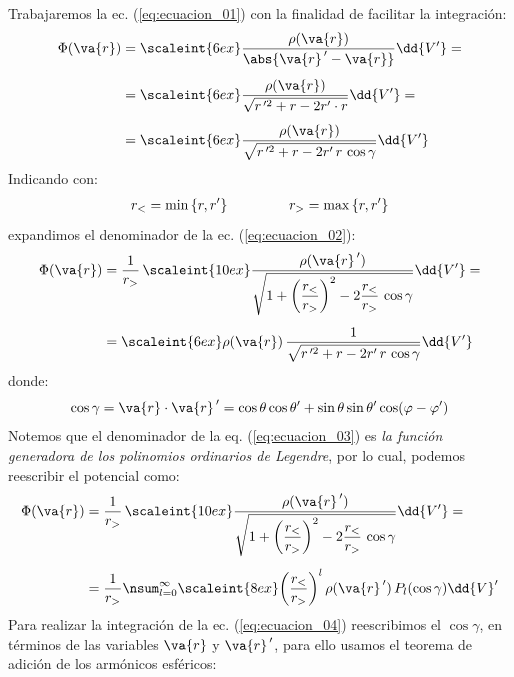 Trabajaremos la ec. (\ref{eq:ecuacion_01}) con la finalidad de facilitar la integración:
\begin{align}
\begin{aligned}
\Phi (\va{r}) &= \scaleint{6ex} \dfrac{\rho(\va{r})}{\abs{\va{r}^{\, \prime} - \va{r}}} \dd{V^{\prime}} = \\[0.5em]
&= \scaleint{6ex} \dfrac{\rho(\va{r})}{\sqrt{r^{\, \prime 2} + r - 2 r^{\prime} \cdot r}} \dd{V^{\prime}} = \\[0.5em]
&= \scaleint{6ex} \dfrac{\rho(\va{r})}{\sqrt{r^{\, \prime 2} + r - 2 r^{\prime} \, r \, \cos \gamma }} \dd{V^{\prime}}
\end{aligned}
\label{eq:ecuacion_02}
\end{align}
Indicando con:
\begin{align*}
r_{<} = \min \left\{ r, r^{\prime} \right\} \hspace{1.5cm} r_{>} = \max \left\{ r, r^{\prime} \right\}
\end{align*}
expandimos el denominador de la ec. (\ref{eq:ecuacion_02}):
\begin{align}
\Phi (\va{r}) &= \dfrac{1}{r_{>}} \, \scaleint{10ex} \dfrac{\rho (\va{r}^{\, \prime})}{\sqrt{1 + \bigg( \dfrac{r_{<}}{r_{>}} \bigg)^{2} - 2 \dfrac{r_{<}}{r_{>}} \, \cos \gamma}} \dd{V^{\prime}} = \\[0.5em]
&= \scaleint{6ex} \rho(\va{r}) \, \dfrac{1}{\sqrt{r^{\, \prime 2} + r - 2 r^{\prime} \, r \, \cos \gamma }} \dd{V^{\prime}}
\label{eq:ecuacion_03}
\end{align}
donde:
\begin{align*}
\cos \gamma = \va{r} \cdot \va{r}^{\, \prime} = \cos \theta \cos \theta^{\prime} +  \sin \theta \sin \theta^{\prime} \cos (\varphi - \varphi^{\prime})
\end{align*}
Notemos que el denominador de la eq. (\ref{eq:ecuacion_03}) es \emph{la función generadora de los polinomios ordinarios de Legendre}, por lo cual, podemos reescribir el potencial como:
\begin{align}
\Phi (\va{r}) &= \dfrac{1}{r_{>}} \, \scaleint{10ex} \dfrac{\rho (\va{r}^{\, \prime})}{\sqrt{1 + \bigg( \dfrac{r_{<}}{r_{>}} \bigg)^{2} - 2 \dfrac{r_{<}}{r_{>}} \, \cos \gamma}} \dd{V^{\prime}} = \\[0.5em]
&= \dfrac{1}{r_{>}} \nsum_{l=0}^{\infty} \scaleint{8ex} \bigg( \dfrac{r_{<}}{r_{>}} \bigg)^{l} \, \rho (\va{r}^{\, \prime}) \, P_{l} (\cos \gamma) \dd{V}^{\prime}
\label{eq:ecuacion_04}
\end{align}
Para realizar la integración de la ec. (\ref{eq:ecuacion_04}) reescribimos el $\cos \gamma$, en términos de las variables $\va{r}$ y $\va{r}^{\, \prime}$, para ello usamos el teorema de adición de los armónicos esféricos:
